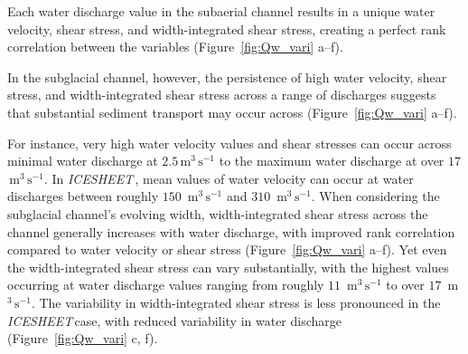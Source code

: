 \documentclass[draft]{agujournal2019}
\newcommand{\icesheet}{\textit{ICESHEET}\,}
\newcommand{\unit}[1]{$\mathrm{#1}$}
\begin{document}
Each water discharge value in the subaerial channel results in a unique water velocity, shear stress, and width-integrated shear stress, creating a perfect rank correlation between the variables (Figure~\ref{fig:Qw_vari} a--f).

In the subglacial channel, however, the persistence of high water velocity, shear stress, and width-integrated shear stress across a range of discharges suggests that substantial sediment transport may occur across  (Figure~\ref{fig:Qw_vari} a--f).



For instance, very high  water velocity values and shear stresses can occur across minimal water discharge at $2.5$\,\unit{m}$^3$\,\unit{s}$^{-1}$ to the maximum water discharge at over $17$ \,\unit{m}$^3$\,\unit{s}$^{-1}$.
In \icesheet, mean values of water velocity can occur at water discharges between roughly $150$ \,\unit{m}$^3$\,\unit{s}$^{-1}$ and $310$ \,\unit{m}$^3$\,\unit{s}$^{-1}$.
When considering the subglacial channel's evolving width, width-integrated shear stress  across the channel generally increases with water discharge, with improved rank correlation compared to water velocity or shear stress (Figure~\ref{fig:Qw_vari} a--f).
Yet even the width-integrated shear stress  can vary substantially, with the highest values occurring at water discharge values ranging from roughly $11$ \,\unit{m}$^3$\,\unit{s}$^{-1}$ to over $17$ \,\unit{m}$^3$\,\unit{s}$^{-1}$.
The variability in width-integrated shear stress is less pronounced in the \icesheet case, with reduced variability in water discharge (Figure~\ref{fig:Qw_vari} c, f).
\end{document}
